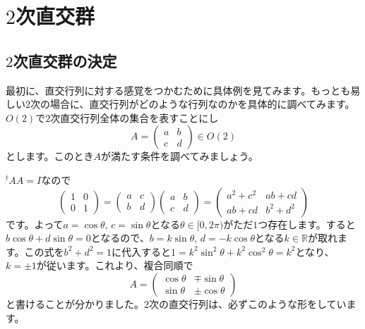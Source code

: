 \section{$2$次直交群}

\subsection{$2$次直交群の決定} 

最初に、直交行列に対する感覚をつかむために具体例を見てみます。もっとも易しい$2$次の場合に、直交行列がどのような行列なのかを具体的に調べてみます。$O(2)$で$2$次直交行列全体の集合を表すことにし
\[
A = 
\begin{pmatrix}
a & b \\
c & d
\end{pmatrix}
\in O(2)
\]
とします。このとき$A$が満たす条件を調べてみましょう。

${}^tA A = I$なので
\[
\begin{pmatrix}
1 & 0 \\
0 & 1
\end{pmatrix}
=
\begin{pmatrix}
a & c \\
b & d
\end{pmatrix}
\begin{pmatrix}
a & b \\
c & d
\end{pmatrix}
= 
\begin{pmatrix}
a^2 + c^2 & ab + cd \\
ab + cd & b^2 + d^2
\end{pmatrix}
\]
です。よって$a = \cos \theta$, $c = \sin \theta$となる$\theta \in [0, 2\pi)$がただ$1$つ存在します。すると$b \cos \theta + d \sin \theta = 0$となるので、$b = k \sin \theta$, $d = -k \cos \theta$となる$k \in \mathbb{R}$が取れます。この式を$b^2 + d^2 = 1$に代入すると$1 = k^2 \sin^2 \theta + k^2 \cos^2 \theta = k^2$となり、$k = \pm1$が従います。これより、複合同順で
\[
A =
\begin{pmatrix}
\cos \theta & \mp \sin \theta \\
\sin \theta & \pm \cos \theta
\end{pmatrix}
\]
と書けることが分かりました。$2$次の直交行列は、必ずこのような形をしています。

